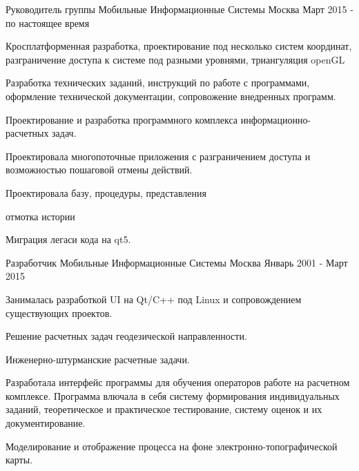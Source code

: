 

\begin{cventries}

  \cventry
    {Руководитель группы} %
    {Мобильные Информационные Системы} %
    {Москва} %
    {Март 2015 - по настоящее время} %
    {
      \begin{cvitems} %
        \item {Кросплатформенная разработка, проектирование под несколько систем координат, разграничение доступа к системе под разными уровнями, триангуляция openGL}
        \item {Разработка технических заданий, инструкций по работе с программами, оформление технической документации, сопровожение внедренных программ.}
        \item {Проектирование и разработка программного комплекса информационно-расчетных задач.}
        \item {Проектировала многопоточные приложения с разграничением доступа и возможностью пошаговой отмены действий.}
        \item {Проектировала базу, процедуры, представления}
        \item {отмотка истории}
        \item {Миграция легаси кода на qt5.}
      \end{cvitems}
    }
  \cventry
    {Разработчик} %
    {Мобильные Информационные Системы} %
    {Москва} %
    {Январь 2001 - Март 2015} %
    {
      \begin{cvitems} %
        \item {Занималась разработкой UI на Qt/C++ под Linux и сопровождением существующих проектов.}
        \item {Решение расчетных задач геодезической направленности.}
        \item {Инженерно-штурманские расчетные задачи.}
        \item {Разработала интерфейс программы для обучения операторов работе на расчетном комплексе. Программа влючала в себя систему формирования индивидуальных заданий, теоретическое и практическое тестирование, систему оценок и их документирование.}
        \item {Моделирование  и отображение процесса на фоне электронно-топографической карты.}
      \end{cvitems}
    }    

\end{cventries}
